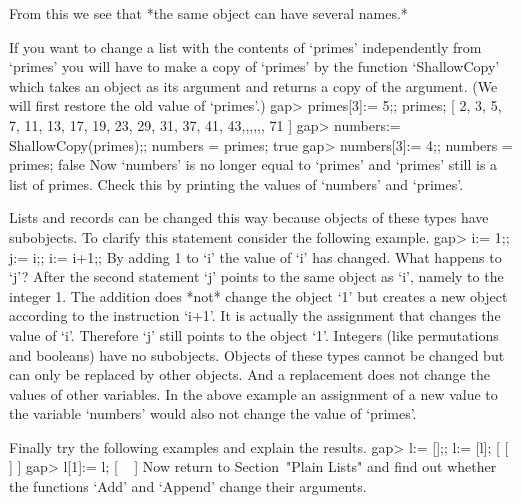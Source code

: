 From this we see that *the same object can have several names.*

If you want to change a list with the  contents of `primes' independently
from `primes'  you will have to  make a copy of  `primes' by the function
`ShallowCopy' which takes an object as its argument and returns a copy of
the argument. (We will first restore the old value of `primes'.)
\beginexample
    gap> primes[3]:= 5;; primes;
    [ 2, 3, 5, 7, 11, 13, 17, 19, 23, 29, 31, 37, 41, 43,,,,,, 71 ]
    gap> numbers:= ShallowCopy(primes);; numbers = primes;
    true
    gap> numbers[3]:= 4;; numbers = primes;
    false 
\endexample
Now `numbers' is no longer equal to `primes' and `primes' still is a list
of primes.  Check this by printing the values of `numbers' and `primes'.

Lists and records can be changed this way because {\GAP} objects of these
types have subobjects.
To clarify this statement consider the following example.
\beginexample
    gap> i:= 1;; j:= i;; i:= i+1;; 
\endexample
By adding 1 to `i' the value of `i' has  changed.   What  happens to `j'?
After the second statement `j' points to the same object  as `i',  namely
to the  integer 1.  The  addition  does *not* change  the object `1'  but
creates a new object according  to the instruction `i+1'.  It is actually
the assignment that changes the value of `i'.  Therefore `j' still points
to  the object `1'.  Integers  (like permutations and  booleans)  have no
subobjects.  Objects  of these types  cannot  be  changed but can only be
replaced by other objects.   And a replacement does not change the values
of other variables.  In the above example an assignment of a new value to
the variable `numbers' would also not change the value of `primes'.

Finally try the following examples and explain the results.
\beginexample
    gap> l:= [];; l:= [l];
    [ [  ] ]
    gap> l[1]:= l;
    [ ~ ]
\endexample
Now return to Section~"Plain Lists" and find out whether the functions
`Add' and `Append' change their arguments.


